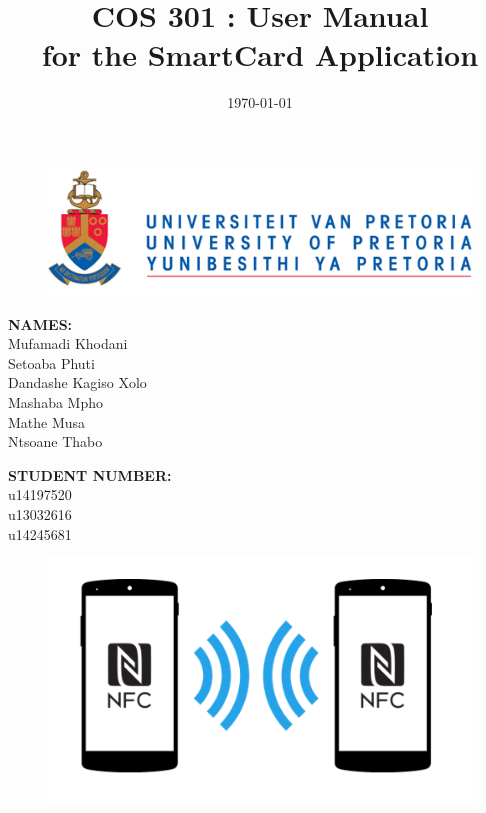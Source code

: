 \documentclass[english]{article}
\title{COS 301 : User Manual\\
	for the SmartCard Application\\
	}
\date{\today}
\begin{document}
	\maketitle
	\begin{figure}[!t]
		\includegraphics{up_logo.png}
	\end{figure}
	\begin{minipage}{0.4\textwidth}
		\begin{flushleft} \large
			\textbf{NAMES:}\\[0.4cm]
			Mufamadi {Khodani} \\
			Setoaba {Phuti} \\
			Dandashe {Kagiso Xolo} \\
			Mashaba {Mpho} \\
			Mathe {Musa} \\
			Ntsoane {Thabo}\\
		\end{flushleft}
	\end{minipage}
	\begin{minipage}{0.4\textwidth}
		\begin{flushright} \large
			\textbf{STUDENT NUMBER:} \\[0.4cm]
			u14197520 \\
			u13032616 \\
			u14245681 \\
		\end{flushright}
\end{minipage}

	
	\newpage

	\tableofcontents
	

	
\newpage
	\begin{figure}[!t]
		\centering
		\includegraphics[scale=0.6]{NFC.png}
	\end{figure}
\end{document}
